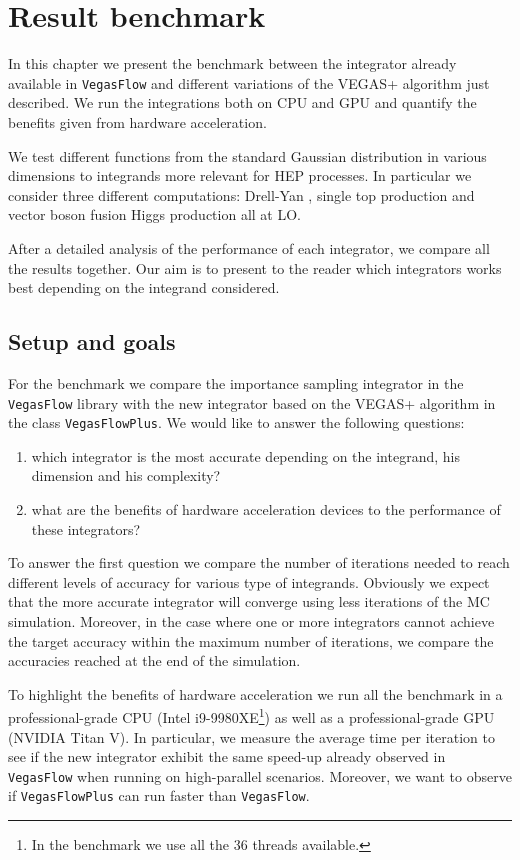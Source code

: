 \documentclass[../main/main.tex]{subfiles}
\begin{document}
\chapter{Result benchmark}
	
In this chapter we present the benchmark between the integrator already available in \texttt{VegasFlow} and different variations of the VEGAS+ algorithm just described. We run the integrations both on CPU and GPU and quantify the benefits given from hardware acceleration.

We test different functions from the standard Gaussian distribution in various dimensions to integrands more relevant for HEP processes. In particular we consider three different computations: Drell-Yan \cite{Carrazza_2020}, single top production \cite{Brucherseifer_2014} and vector boson fusion Higgs production \cite{Carrazza_2021} all at LO.

After a detailed analysis of the performance of each integrator, we compare all the results together. Our aim is to present to the reader which integrators works best depending on the integrand considered.
\section{Setup and goals}
For the benchmark we compare the importance sampling integrator in the \texttt{VegasFlow} library with the new integrator based on the VEGAS+ algorithm  in the class \texttt{VegasFlowPlus}.
We would like to answer the following questions:
\begin{enumerate}
	\item which integrator is the most accurate depending on the integrand, his dimension and his complexity?
	\item what are the benefits of hardware acceleration devices to the performance of these integrators?
\end{enumerate}

To answer the first question we compare the number of iterations needed to reach different levels of accuracy for various type of integrands.
Obviously we expect that the more accurate integrator will converge using less iterations of the MC simulation. Moreover, in the case where one or more integrators cannot achieve the target accuracy within the maximum number of iterations, we compare the accuracies reached at the end of the simulation.

To highlight the benefits of hardware acceleration we run all the benchmark in a professional-grade CPU (Intel i9-9980XE\footnote{In the benchmark we use all the 36 threads available.}) as well as a professional-grade GPU (NVIDIA Titan V). In particular, we measure the average time per iteration to see if the new integrator exhibit the same speed-up already observed in \texttt{VegasFlow} when running on 
high-parallel scenarios. Moreover, we want to observe if \texttt{VegasFlowPlus} can run faster than \texttt{VegasFlow}.
\end{document}
